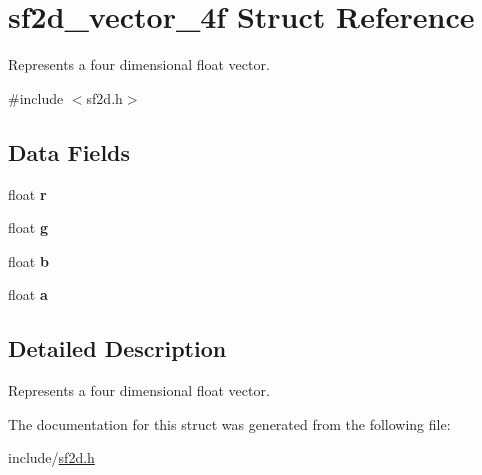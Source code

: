 \hypertarget{structsf2d__vector__4f}{\section{sf2d\-\_\-vector\-\_\-4f Struct Reference}
\label{structsf2d__vector__4f}
}


Represents a four dimensional float vector.  




{\ttfamily \#include $<$sf2d.\-h$>$}

\subsection*{Data Fields}
\begin{DoxyCompactItemize}
\item 
\hypertarget{structsf2d__vector__4f_a9b6406bf98af7640a13a9027b64c7b04}{float {\bfseries r}}\label{structsf2d__vector__4f_a9b6406bf98af7640a13a9027b64c7b04}

\item 
\hypertarget{structsf2d__vector__4f_a1c6ed8a78238cc48834cfdd3022efa3c}{float {\bfseries g}}\label{structsf2d__vector__4f_a1c6ed8a78238cc48834cfdd3022efa3c}

\item 
\hypertarget{structsf2d__vector__4f_a086d3a04d19322849a3ffa1e01f18c41}{float {\bfseries b}}\label{structsf2d__vector__4f_a086d3a04d19322849a3ffa1e01f18c41}

\item 
\hypertarget{structsf2d__vector__4f_aac68efbadd85967e74d917970f595823}{float {\bfseries a}}\label{structsf2d__vector__4f_aac68efbadd85967e74d917970f595823}

\end{DoxyCompactItemize}


\subsection{Detailed Description}
Represents a four dimensional float vector. 

The documentation for this struct was generated from the following file\-:\begin{DoxyCompactItemize}
\item 
include/\hyperlink{sf2d_8h}{sf2d.\-h}\end{DoxyCompactItemize}
